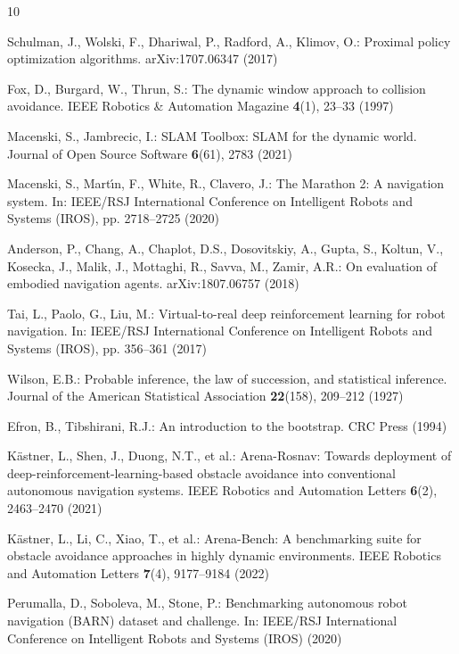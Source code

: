 \documentclass[runningheads]{llncs}
\begin{document}

\begin{thebibliography}{10}

Schulman, J., Wolski, F., Dhariwal, P., Radford, A., Klimov, O.: Proximal policy optimization algorithms. arXiv:1707.06347 (2017)

Fox, D., Burgard, W., Thrun, S.: The dynamic window approach to collision avoidance. IEEE Robotics \& Automation Magazine \textbf{4}(1), 23--33 (1997)

Macenski, S., Jambrecic, I.: SLAM Toolbox: SLAM for the dynamic world. Journal of Open Source Software \textbf{6}(61), 2783 (2021)

Macenski, S., Mart{\'\i}n, F., White, R., Clavero, J.: The Marathon 2: A navigation system. In: IEEE/RSJ International Conference on Intelligent Robots and Systems (IROS), pp. 2718--2725 (2020)

Anderson, P., Chang, A., Chaplot, D.S., Dosovitskiy, A., Gupta, S., Koltun, V., Kosecka, J., Malik, J., Mottaghi, R., Savva, M., Zamir, A.R.: On evaluation of embodied navigation agents. arXiv:1807.06757 (2018)

Tai, L., Paolo, G., Liu, M.: Virtual-to-real deep reinforcement learning for robot navigation. In: IEEE/RSJ International Conference on Intelligent Robots and Systems (IROS), pp. 356--361 (2017)

Wilson, E.B.: Probable inference, the law of succession, and statistical inference. Journal of the American Statistical Association \textbf{22}(158), 209--212 (1927)

Efron, B., Tibshirani, R.J.: An introduction to the bootstrap. CRC Press (1994)

K{\"a}stner, L., Shen, J., Duong, N.T., et al.: Arena-Rosnav: Towards deployment of deep-reinforcement-learning-based obstacle avoidance into conventional autonomous navigation systems. IEEE Robotics and Automation Letters \textbf{6}(2), 2463--2470 (2021)

K{\"a}stner, L., Li, C., Xiao, T., et al.: Arena-Bench: A benchmarking suite for obstacle avoidance approaches in highly dynamic environments. IEEE Robotics and Automation Letters \textbf{7}(4), 9177--9184 (2022)

Perumalla, D., Soboleva, M., Stone, P.: Benchmarking autonomous robot navigation (BARN) dataset and challenge. In: IEEE/RSJ International Conference on Intelligent Robots and Systems (IROS) (2020)


\end{thebibliography}
\end{document}
